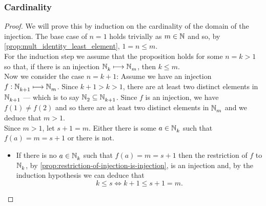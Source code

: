\documentclass[../MathsNotesBase.tex]{subfiles}
\begin{document}
{		
		
		\biggerskip
		\subsubsection{Cardinality}
		\bigskip
		
	
		\biggerskip
		\begin{proof}
			We will prove this by induction on the cardinality of the domain of the injection. The base case of ${ n = 1 }$ holds trivially as ${ m \in \mathbb{N}^{} }$ and so, by \autoref{prop:mult_identity_least_element}, ${ 1 = n \leq m }$.\\
			
			For the induction step we assume that the proposition holds for some ${ n = k > 1 }$ so that, if there is an injection ${ \mathbb{N}^{}_k \longmapsto \mathbb{N}^{}_m }$, then ${ k \leq m }$.\\
			
			Now we consider the case ${ n = k+1 }$: Assume we have an injection ${ f: \mathbb{N}^{}_{k+1} \longmapsto \mathbb{N}^{}_m }$. Since ${ k+1 > k > 1 }$, there are at least two distinct elements in $\mathbb{N}^{}_{k+1}$ --- which is to say ${ \mathbb{N}^{}_2 \subseteq \mathbb{N}^{}_{k+1} }$. Since $f$ is an injection, we have ${ f(1) \neq f(2) }$ and so there are at least two distinct elements in $\mathbb{N}^{}_m$ and we deduce that ${ m > 1 }$.\\
			
			Since ${ m > 1 }$, let ${ s + 1 = m }$. Either there is some ${ a \in \mathbb{N}^{}_k }$ such that ${ f(a) = m = s+1 }$ or there is not.
			\begin{itemize}
				\item If there is no ${ a \in \mathbb{N}^{}_k }$ such that ${ f(a) = m = s+1 }$ then the restriction of $f$ to $\mathbb{N}^{}_k$, by \autoref{prop:restriction-of-injection-is-injection}, is an injection and, by the induction hypothesis we can deduce that
				\[ k \leq s \iff k + 1 \leq s + 1 = m. \]
				

\end{itemize}
\end{proof}}
\end{document}
